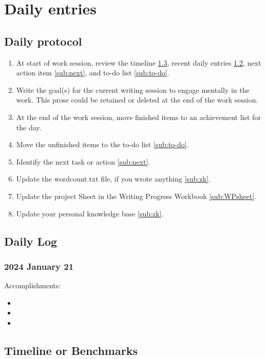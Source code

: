 \documentclass[10pt,letterpaper]{article}
\newcommand{\bi}{\begin{itemize}}
\newcommand{\ei}{\end{itemize}}
\newcommand{\be}{\begin{enumerate}}
\newcommand{\ee}{\end{enumerate}}
\begin{document}
\section{Daily entries}
\label{sec:dailyEntries}

\subsection{Daily protocol}
\label{sub:entry-protocol}

\be
\item At start of work session, review the timeline \ref{sub:benchmarks}, recent daily entries \ref{sub:daily-log}, next action item \ref{sub:next}, and to-do list \ref{sub:to-do}.
\item Write the goal(s) for the current writing session to engage mentally in the work. This prose could be retained or deleted at the end of the work session.
\item At the end of the work session, move finished items to an achievement list for the day.
\item Move the unfinished items to the to-do list \ref{sub:to-do}.
\item Identify the next task or action \ref{sub:next}.
\item Update the wordcount.txt file, if you wrote anything \ref{sub:zk}.
\item Update the project Sheet in the Writing Progress Workbook \ref{sub:WPsheet}.
\item Update your personal knowledge base \ref{sub:zk}.
\ee


\subsection{Daily Log}
\label{sub:daily-log}


\subsubsection{2024 January 21}

Accomplishments:
\bi
\item 
\item
\item
\ei

\subsection{Timeline or Benchmarks}
\label{sub:benchmarks}
\end{document}

